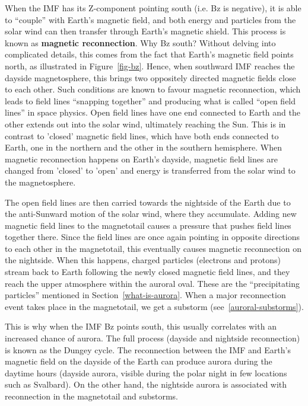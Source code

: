 \documentclass{article}
\begin{document}
When the IMF has its Z-component pointing south (i.e. Bz is negative), it is able to ``couple'' with Earth's magnetic field, and both energy and particles from the solar wind can then transfer through Earth's magnetic shield. This process is known as \textbf{magnetic reconnection}. Why Bz south? Without delving into complicated details, this comes from the fact that Earth's magnetic field points north, as illustrated in Figure~\ref{fig-bz}. Hence, when southward IMF reaches the dayside magnetosphere, this brings two oppositely directed magnetic fields close to each other. Such conditions are known to favour magnetic reconnection, which leads to field lines ``snapping together'' and producing what is called ``open field lines'' in space physics. Open field lines have one end connected to Earth and the other extends out into the solar wind, ultimately reaching the Sun. This is in contrast to 'closed' magnetic field lines, which have both ends connected to Earth, one in the northern and the other in the southern hemisphere. When magnetic reconnection happens on Earth's dayside, magnetic field lines are changed from 'closed' to 'open' and energy is transferred from the solar wind to the magnetosphere.

The open field lines are then carried towards the nightside of the Earth due to the anti-Sunward motion of the solar wind, where they accumulate. Adding new magnetic field lines to the magnetotail causes a pressure that pushes field lines together there. Since the field lines are once again pointing in opposite directions to each other in the magnetotail, this eventually causes magnetic reconnection on the nightside. When this happens, charged particles (electrons and protons) stream back to Earth following the newly closed magnetic field lines, and they reach the upper atmosphere within the auroral oval. These are the ``precipitating particles'' mentioned in Section~\ref{what-is-aurora}. When a major reconnection event takes place in the magnetotail, we get a substorm (see~\ref{auroral-substorms}).

This is why when the IMF Bz points south, this usually correlates with an increased chance of aurora. The full process (dayside and nightside reconnection) is known as the Dungey cycle. The reconnection between the IMF and Earth's magnetic field on the dayside of the Earth can produce aurora during the daytime hours (dayside aurora, visible during the polar night in few locations such as Svalbard). On the other hand, the nightside aurora is associated with reconnection in the magnetotail and substorms.
\end{document}
